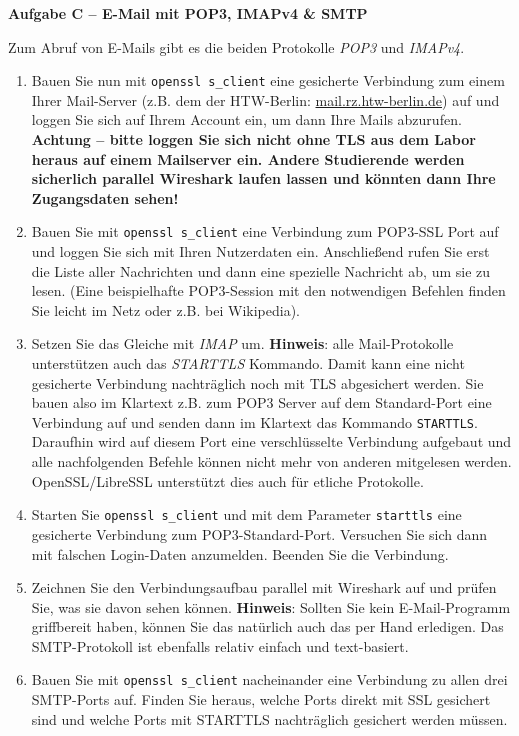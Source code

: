 \documentclass[paper=a4,fontsize=11pt]{scrartcl}%
\numberwithin{equation}{section}
\begin{document}
\begin{center}\Large{\textbf{Aufgabe C -- E-Mail mit POP3, IMAPv4 \& SMTP}}\end{center}\vskip0.25in
Zum Abruf von E-Mails gibt es die beiden Protokolle \emph{POP3} und \emph{IMAPv4}.
\begin{enumerate}
	\item Bauen Sie nun mit \texttt{openssl s\_client} eine gesicherte Verbindung zum einem Ihrer Mail-Server (z.B. dem der HTW-Berlin: \url{mail.rz.htw-berlin.de}) auf und loggen Sie sich auf Ihrem Account ein, um dann Ihre Mails abzurufen.\\
	{\color{red}\textbf{Achtung -- bitte loggen Sie sich nicht ohne TLS aus dem Labor heraus auf einem Mailserver ein. Andere Studierende werden sicherlich parallel Wireshark  laufen lassen und könnten dann Ihre Zugangsdaten sehen!}}
	\item Bauen Sie mit \texttt{openssl s\_client} eine Verbindung zum POP3-SSL Port auf und loggen Sie sich mit Ihren Nutzerdaten ein. Anschließend rufen Sie erst die Liste aller Nachrichten und dann eine spezielle Nachricht ab, um sie zu lesen. (Eine beispielhafte POP3-Session mit den notwendigen Befehlen finden Sie leicht im Netz oder z.B. bei Wikipedia).
	\item Setzen Sie das Gleiche mit \emph{IMAP} um.
	\textbf{Hinweis}: alle Mail-Protokolle unterstützen auch das \emph{STARTTLS} Kommando. Damit kann eine nicht gesicherte Verbindung nachträglich noch mit TLS abgesichert werden. Sie bauen also im Klartext z.B. zum POP3 Server auf dem Standard-Port eine Verbindung auf und senden dann im Klartext das Kommando \texttt{STARTTLS}. Daraufhin wird auf diesem Port eine verschlüsselte Verbindung aufgebaut und alle nachfolgenden Befehle können nicht mehr von anderen mitgelesen werden. OpenSSL/LibreSSL unterstützt dies auch für etliche Protokolle.
	\item Starten Sie \texttt{openssl s\_client} und mit dem Parameter \texttt{starttls} eine gesicherte Verbindung zum POP3-Standard-Port. Versuchen Sie sich dann mit falschen Login-Daten anzumelden. Beenden Sie die Verbindung.
 	\item Zeichnen Sie den Verbindungsaufbau parallel mit Wireshark auf und prüfen Sie, was sie davon sehen können.
	\textbf{Hinweis}: Sollten Sie kein E-Mail-Programm griffbereit haben, können Sie das natürlich auch das per Hand erledigen. Das SMTP-Protokoll ist ebenfalls relativ einfach und text-basiert.
 	\item Bauen Sie mit \texttt{openssl s\_client} nacheinander eine Verbindung zu allen drei SMTP-Ports auf. Finden Sie heraus, welche Ports direkt mit SSL gesichert sind und welche Ports mit STARTTLS nachträglich gesichert werden müssen.

\end{enumerate}
\end{document}
